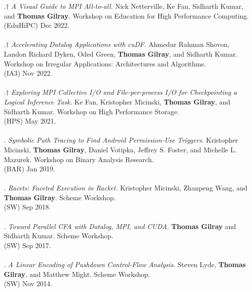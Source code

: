 \paper.$\dagger$ \textit{A Visual Guide to MPI All-to-all.}
Nick Netterville, Ke Fan, Sidharth Kumar, and \textbf{Thomas Gilray}.
Workshop on Education for High Performance Computing.
\\(EduHiPC) Dec 2022. 
\\ \vspace{-0.1cm}\\
\paper.$\dagger$ \textit{Accelerating Datalog Applications with cuDF.}
Ahmedur Rahman Shovon, Landon Richard Dyken, Oded Green, \textbf{Thomas Gilray}, and Sidharth Kumar.
Workshop on Irregular Applications: Architectures and Algorithms.
\\(IA3) Nov 2022. 
\\ \vspace{-0.1cm}\\
\paper.$\dagger$ \textit{Exploring MPI Collective I/O and File-per-process I/O for Checkpointing a Logical Inference Task.}
Ke Fan, Kristopher Micinski, \textbf{Thomas Gilray}, and Sidharth Kumar.
Workshop on High Performance Storage.
\\(HPS) May 2021. 
\\ \vspace{-0.1cm}\\
\paper. \textit{Symbolic Path Tracing to Find Android Permission-Use Triggers.}
Kristopher Micinski, \textbf{Thomas Gilray}, Daniel Votipka, Jeffrey S. Foster, and Michelle L. Mazurek.
Workshop on Binary Analysis Research.
\\(BAR) Jan 2019. 
\\ \vspace{-0.1cm}\\
\paper. \textit{Racets: Faceted Execution in Racket.}
Kristopher Micinski, Zhanpeng Wang, and \textbf{Thomas Gilray}.
Scheme Workshop.
\\(SW) Sep 2018. 
\\ \vspace{-0.1cm}\\
\paper. \textit{Toward Parallel CFA with Datalog, MPI, and CUDA.}
\textbf{Thomas Gilray} and Sidharth Kumar.
Scheme Workshop.
\\(SW) Sep 2017. 
\\ \vspace{-0.1cm}\\
\paper. \textit{A Linear Encoding of Pushdown Control-Flow Analysis.}
Steven Lyde, \textbf{Thomas Gilray}, and Matthew Might.
Scheme Workshop.
\\(SW) Nov 2014. 
\\ \vspace{-0.1cm}\\
